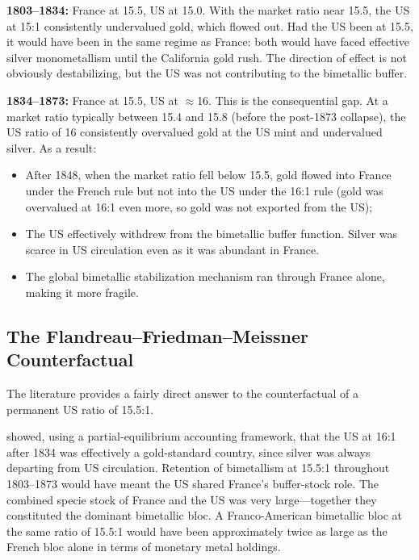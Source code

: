 \documentclass[12pt,letterpaper]{article}
\begin{document}
\textbf{1803--1834:} France at 15.5, US at 15.0.  With the market ratio near 15.5,
the US at 15:1 consistently undervalued gold, which flowed out.  Had the US been at
15.5, it would have been in the same regime as France: both would have faced
effective silver monometallism until the California gold rush.  The direction of
effect is not obviously destabilizing, but the US was not contributing to the
bimetallic buffer.

\textbf{1834--1873:} France at 15.5, US at $\approx$16.  This is the consequential
gap.  At a market ratio typically between 15.4 and 15.8 (before the post-1873
collapse), the US ratio of 16 consistently overvalued gold at the US mint and
undervalued silver.  As a result:
\begin{itemize}
  \item After 1848, when the market ratio fell below 15.5, gold flowed into
  France under the French rule but not into the US under the 16:1 rule (gold was
  overvalued at 16:1 even more, so gold was not exported from the US);
  \item The US effectively withdrew from the bimetallic buffer function.  Silver
  was scarce in US circulation even as it was abundant in France.
  \item The global bimetallic stabilization mechanism ran through France alone,
  making it more fragile.
\end{itemize}

\subsection{The Flandreau--Friedman--Meissner Counterfactual}

The literature provides a fairly direct answer to the counterfactual of a permanent
US ratio of 15.5:1.

\citet{friedman1990jep} showed, using a partial-equilibrium accounting framework,
that the US at 16:1 after 1834 was effectively a gold-standard country, since
silver was always departing from US circulation.  Retention of bimetallism at
15.5:1 throughout 1803--1873 would have meant the US shared France's buffer-stock
role.  The combined specie stock of France and the US was very large---together they
constituted the dominant bimetallic bloc.  A Franco-American bimetallic bloc at the
same ratio of 15.5:1 would have been approximately twice as large as the French
bloc alone in terms of monetary metal holdings.
\end{document}
